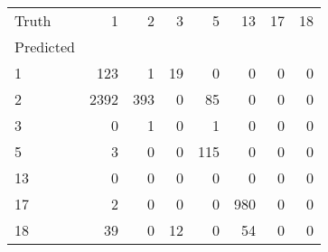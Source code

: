 \begin{tabular}{lrrrrrrr}
\toprule
Truth & 1 & 2 & 3 & 5 & 13 & 17 & 18 \\
Predicted &  &  &  &  &  &  &  \\
\midrule
1 & 123 & 1 & 19 & 0 & 0 & 0 & 0 \\
2 & 2392 & 393 & 0 & 85 & 0 & 0 & 0 \\
3 & 0 & 1 & 0 & 1 & 0 & 0 & 0 \\
5 & 3 & 0 & 0 & 115 & 0 & 0 & 0 \\
13 & 0 & 0 & 0 & 0 & 0 & 0 & 0 \\
17 & 2 & 0 & 0 & 0 & 980 & 0 & 0 \\
18 & 39 & 0 & 12 & 0 & 54 & 0 & 0 \\
\bottomrule
\end{tabular}

